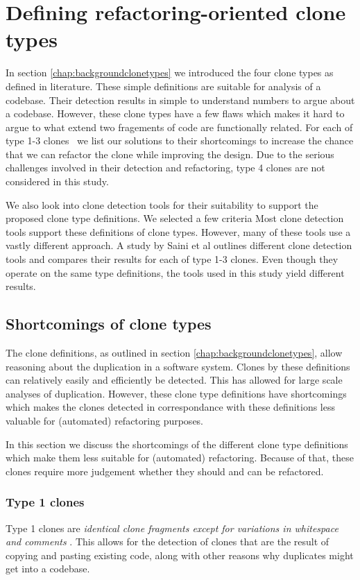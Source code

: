 \chapter{Defining refactoring-oriented clone types}\label{chap:clonetypes}
In section \ref{chap:backgroundclonetypes} we introduced the four clone types as defined in literature. These simple definitions are suitable for analysis of a codebase. Their detection results in simple to understand numbers to argue about a codebase. However, these clone types have a few flaws which makes it hard to argue to what extend two fragements of code are functionally related. For each of type 1-3 clones~\cite{roy2007survey} we list our solutions to their shortcomings to increase the chance that we can refactor the clone while improving the design. Due to the serious challenges involved in their detection and refactoring, type 4 clones are not considered in this study.

We also look into clone detection tools for their suitability to support the proposed clone type definitions. We selected a few criteria  Most clone detection tools support these definitions of clone types. However, many of these tools use a vastly different approach. A study by Saini et al \cite{saini2018towards} outlines different clone detection tools and compares their results for each of type 1-3 clones. Even though they operate on the same type definitions, the tools used in this study yield different results.

\section{Shortcomings of clone types}
The clone definitions, as outlined in section \ref{chap:backgroundclonetypes}, allow reasoning about the duplication in a software system. Clones by these definitions can relatively easily and efficiently be detected. This has allowed for large scale analyses of duplication. However, these clone type definitions have shortcomings which makes the clones detected in correspondance with these definitions less valuable for (automated) refactoring purposes.

In this section we discuss the shortcomings of the different clone type definitions which make them less suitable for (automated) refactoring. Because of that, these clones require more judgement whether they should and can be refactored.

\subsection{Type 1 clones} \label{chap:type1clones}
Type 1 clones are \textit{identical clone fragments except for variations in whitespace and comments} \cite{roy2007survey}. This allows for the detection of clones that are the result of copying and pasting existing code, along with other reasons why duplicates might get into a codebase.

